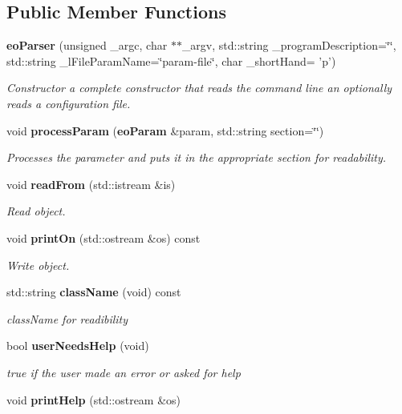 \subsection*{Public Member Functions}
\begin{CompactItemize}
\item 
{\bf eo\-Parser} (unsigned \_\-argc, char $\ast$$\ast$\_\-argv, std::string \_\-program\-Description=\char`\"{}\char`\"{}, std::string \_\-l\-File\-Param\-Name=\char`\"{}param-file\char`\"{}, char \_\-short\-Hand= 'p')
\begin{CompactList}\small\item\em Constructor a complete constructor that reads the command line an optionally reads a configuration file. \item\end{CompactList}\item 
void {\bf process\-Param} ({\bf eo\-Param} \&param, std::string section=\char`\"{}\char`\"{})\label{classeo_parser_a1}

\begin{CompactList}\small\item\em Processes the parameter and puts it in the appropriate section for readability. \item\end{CompactList}\item 
void {\bf read\-From} (std::istream \&is)
\begin{CompactList}\small\item\em Read object. \item\end{CompactList}\item 
void {\bf print\-On} (std::ostream \&os) const 
\begin{CompactList}\small\item\em Write object. \item\end{CompactList}\item 
std::string {\bf class\-Name} (void) const \label{classeo_parser_a4}

\begin{CompactList}\small\item\em class\-Name for readibility \item\end{CompactList}\item 
bool {\bf user\-Needs\-Help} (void)\label{classeo_parser_a5}

\begin{CompactList}\small\item\em true if the user made an error or asked for help \item\end{CompactList}\item 
void {\bf print\-Help} (std::ostream \&os)\label{classeo_parser_a6}


\end{CompactItemize}

